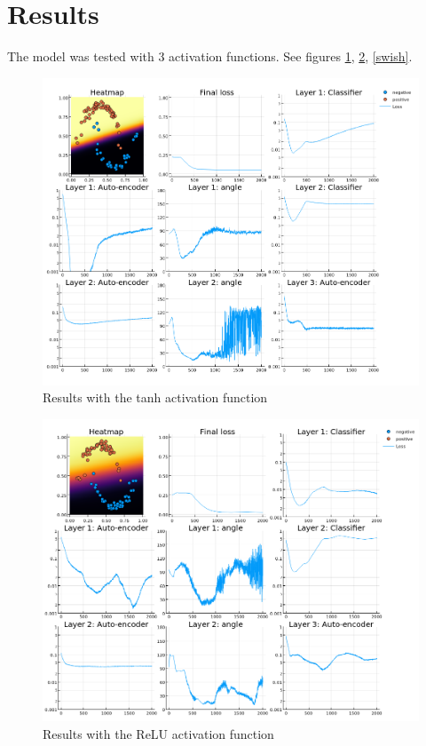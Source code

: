 \section{Results}

The model was tested with 3 activation functions. See figures \ref{tanh}, \ref{relu}, \ref{swish}.

\begin{figure}[h]
	\centering
	\includegraphics[width=500pt]{images/temp-tanh.png}
	\caption{Results with the tanh activation function}\label{tanh}
\end{figure}

\begin{figure}[h]
	\centering
	\includegraphics[width=500pt]{images/temp-relu.png}
	\caption{Results with the ReLU activation function}\label{relu}
\end{figure}

